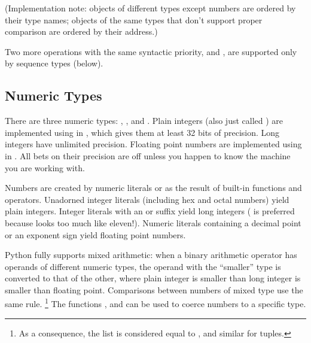 (Implementation note: objects of different types except numbers are
ordered by their type names; objects of the same types that don't
support proper comparison are ordered by their address.)

Two more operations with the same syntactic priority,  and
, are supported only by sequence types (below).

\subsection{Numeric Types}

There are three numeric types: , , and
.  Plain integers (also just called )
are implemented using  in \C{}, which gives them at least 32
bits of precision.  Long integers have unlimited precision.  Floating
point numbers are implemented using  in \C{}.  All bets on
their precision are off unless you happen to know the machine you are
working with.

Numbers are created by numeric literals or as the result of built-in
functions and operators.  Unadorned integer literals (including hex
and octal numbers) yield plain integers.  Integer literals with an 
or  suffix yield long integers
( is preferred because  looks too much like eleven!).
Numeric literals containing a decimal point or an exponent sign yield
floating point numbers.

Python fully supports mixed arithmetic: when a binary arithmetic
operator has operands of different numeric types, the operand with the
``smaller'' type is converted to that of the other, where plain
integer is smaller than long integer is smaller than floating point.
Comparisons between numbers of mixed type use the same rule.%
\footnote{As a consequence, the list \code{[1, 2]} is considered equal
	to \code{[1.0, 2.0]}, and similar for tuples.}
The functions ,  and  can be used
to coerce numbers to a specific type.


